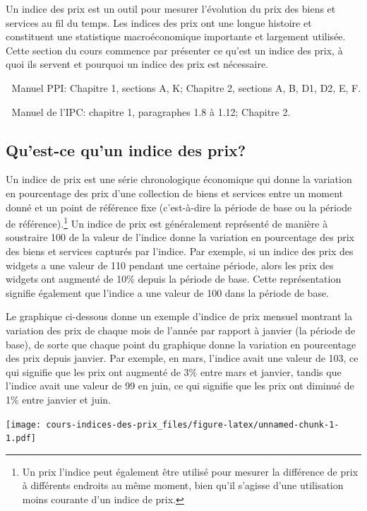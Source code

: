 \documentclass[
]{article}
\begin{document}
Un indice des prix est un outil pour mesurer l'évolution du prix des biens et services au fil du temps. Les indices des prix ont une longue histoire et constituent une statistique macroéconomique importante et largement utilisée. Cette section du cours commence par présenter ce qu'est un indice des prix, à quoi ils servent et pourquoi un indice des prix est nécessaire.

📖 Manuel PPI: Chapitre 1, sections A, K; Chapitre 2, sections A, B, D1, D2, E, F.

📖 Manuel de l'IPC: chapitre 1, paragraphes 1.8 à 1.12; Chapitre 2.

\hypertarget{quest-ce-quun-indice-des-prix}{%
\subsection{Qu'est-ce qu'un indice des prix?}\label{quest-ce-quun-indice-des-prix}}

Un indice de prix est une série chronologique économique qui donne la variation en pourcentage des prix d'une collection de biens et services entre un moment donné et un point de référence fixe (c'est-à-dire la période de base ou la période de référence).\footnote{Un prix l'indice peut également être utilisé pour mesurer la différence de prix à différents endroits au même moment, bien qu'il s'agisse d'une utilisation moins courante d'un indice de prix.} Un indice de prix est généralement représenté de manière à soustraire 100 de la valeur de l'indice donne la variation en pourcentage des prix des biens et services capturés par l'indice. Par exemple, si un indice des prix des widgets a une valeur de 110 pendant une certaine période, alors les prix des widgets ont augmenté de 10\% depuis la période de base. Cette représentation signifie également que l'indice a une valeur de 100 dans la période de base.

Le graphique ci-dessous donne un exemple d'indice de prix mensuel montrant la variation des prix de chaque mois de l'année par rapport à janvier (la période de base), de sorte que chaque point du graphique donne la variation en pourcentage des prix depuis janvier. Par exemple, en mars, l'indice avait une valeur de 103, ce qui signifie que les prix ont augmenté de 3\% entre mars et janvier, tandis que l'indice avait une valeur de 99 en juin, ce qui signifie que les prix ont diminué de 1\% entre janvier et juin.

\texttt{[image: cours-indices-des-prix\_files/figure-latex/unnamed-chunk-1-1.pdf]}
\end{document}
